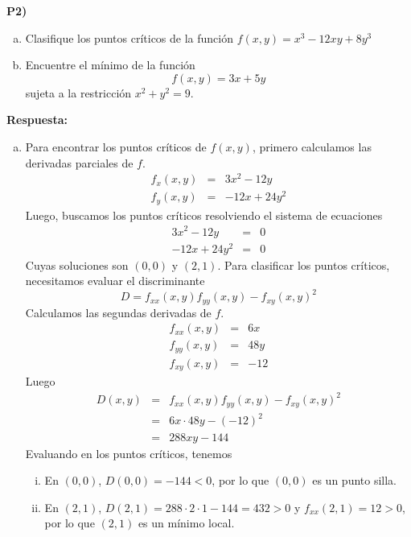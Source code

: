 \documentclass{article}
\begin{document}
\newpage
\noindent\textbf{P2) }
\begin{enumerate}[a)]
  \item Clasifique los puntos críticos de la función $f(x,y) = x^3-12xy+8y^3$
  \item Encuentre el mínimo de la función
    $$f(x,y)=3x+5y$$
  sujeta a la restricción $x^2+y^2=9$.
\end{enumerate}

\vspace{0.25cm}
\noindent\textbf{Respuesta:} 
\begin{enumerate}[a)]
  \item Para encontrar los puntos críticos de $f(x,y)$, primero calculamos las derivadas parciales de $f$.
    \begin{eqnarray*}
      f_x(x,y) &=& 3x^2-12y\\
      f_y(x,y) &=& -12x+24y^2
    \end{eqnarray*}
  Luego, buscamos los puntos críticos resolviendo el sistema de ecuaciones
    \begin{eqnarray*}
      3x^2-12y &=& 0\\
      -12x+24y^2 &=& 0
    \end{eqnarray*}
  Cuyas soluciones son $(0,0)$ y $(2,1)$.
  Para clasificar los puntos críticos, necesitamos evaluar el discriminante
    $$D = f_{xx}(x,y)f_{yy}(x,y)-f_{xy}(x,y)^2$$
  Calculamos las segundas derivadas de $f$.
    \begin{eqnarray*}
      f_{xx}(x,y) &=& 6x\\
      f_{yy}(x,y) &=& 48y\\
      f_{xy}(x,y) &=& -12
    \end{eqnarray*}
  Luego
    \begin{eqnarray*}
      D(x,y) &=& f_{xx}(x,y)f_{yy}(x,y)-f_{xy}(x,y)^2\\
      &=& 6x\cdot 48y - (-12)^2\\
      &=& 288xy-144
    \end{eqnarray*}
  Evaluando en los puntos críticos, tenemos
  \begin{enumerate}[i.]
    \item En $(0,0)$, $D(0,0)=-144<0$, por lo que $(0,0)$ es un punto silla.
    \item En $(2,1)$, $D(2,1)=288\cdot 2\cdot 1-144=432>0$ y $f_{xx}(2,1)=12>0$, por lo que $(2,1)$ es un mínimo local.
  \end{enumerate}


\end{enumerate}
\end{document}
